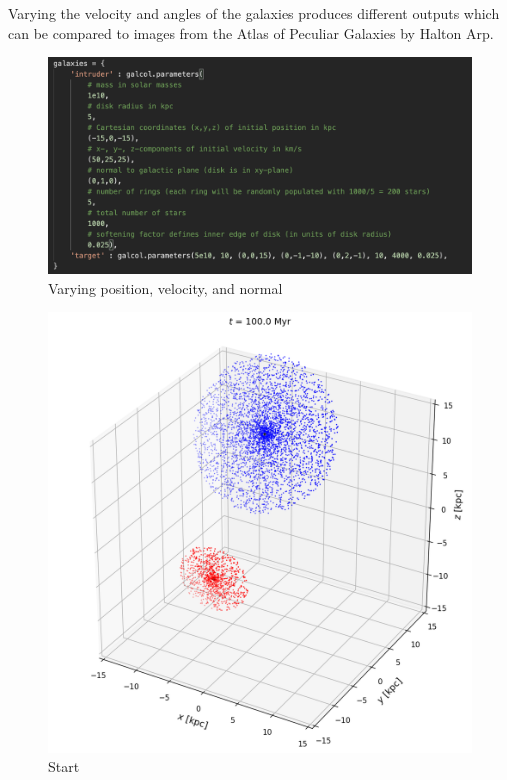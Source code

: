 \documentclass[linenumbers,RNAAS,trackchanges]{aastex631}
\begin{document}
\newpage
Varying the velocity and angles of the galaxies produces different outputs which can be compared to images from the Atlas of Peculiar Galaxies by Halton Arp. \cite{Arp}
\begin{figure}[H]
    \centering
    \includegraphics[scale=.60]{comparison_galaxy/ARP_9_vars.png}
    \caption{Varying position, velocity, and normal}
    \label{fig:code}
\end{figure}
\newpage
\begin{figure}[H]
    \centering
    \includegraphics[scale=.40]{comparison_galaxy/ARP_9_input.png}
    \caption{Start}
    \label{fig:code}
\end{figure}
\end{document}
